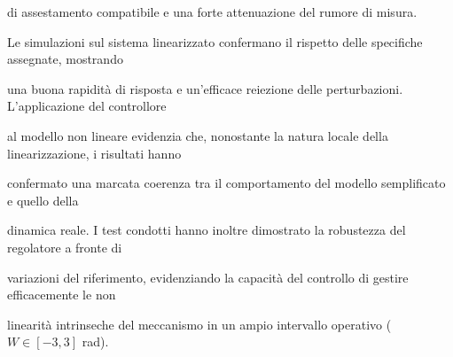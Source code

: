 \documentclass[a4paper, 11pt]{article}
\begin{document}
di assestamento compatibile e una forte attenuazione del rumore di misura.

Le simulazioni sul sistema linearizzato confermano il rispetto delle specifiche assegnate, mostrando 

una buona rapidità di risposta e un’efficace reiezione delle perturbazioni. L’applicazione del controllore 

al modello non lineare evidenzia che, nonostante la natura locale della linearizzazione, i risultati hanno 

confermato una marcata coerenza tra il comportamento del modello semplificato e quello della 

dinamica reale. I test condotti hanno inoltre dimostrato la robustezza del regolatore a fronte di 

variazioni del riferimento, evidenziando la capacità del controllo di gestire efficacemente le non 

linearità intrinseche del meccanismo in un ampio intervallo operativo ($W \in [-3, 3]$ rad).
\end{document}
